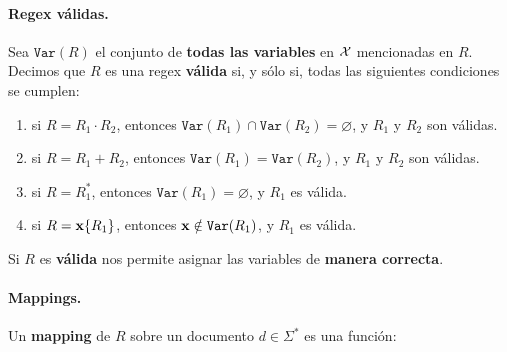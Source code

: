 \paragraph{Regex válidas.} Sea $\texttt{Var}(R)$ el conjunto de \textbf{todas las variables} en $\mathcal{X}$ mencionadas en $R$. Decimos que $R$ es una regex \textbf{válida} si, y sólo si, todas las siguientes condiciones se cumplen:
\begin{enumerate}
    \item si $R = R_1 \cdot R_2$, entonces $\texttt{Var}(R_1) \cap \texttt{Var}(R_2) = \varnothing$, y $R_1$ y $R_2$ son válidas.
    \item si $R = R_1 + R_2$, entonces $\texttt{Var}(R_1) = \texttt{Var}(R_2)$, y $R_1$ y $R_2$ son válidas.
    \item si $R = R_1^*$, entonces $\texttt{Var}(R_1) = \varnothing$, y $R_1$ es válida.
    \item si $R = \mathbf{x}\{R_1\}$, entonces $\mathbf{x} \notin \texttt{Var}(R_1)$, y $R_1$ es válida.
\end{enumerate}

Si $R$ es \textbf{válida} nos permite asignar las variables de \textbf{manera correcta}.


\paragraph{Mappings.} Un \textbf{mapping} de $R$ sobre un documento $d \in \Sigma^*$ es una función:


